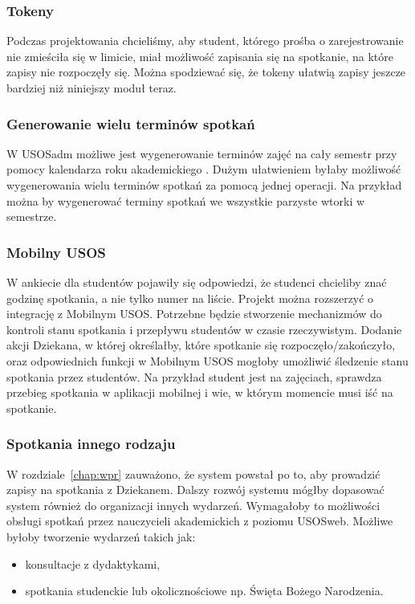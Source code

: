 \documentclass[licencjacka]{pracamgr}
\begin{document}
\subsubsection{Tokeny}
Podczas projektowania chcieliśmy, aby student, którego prośba o zarejestrowanie nie zmieściła się w limicie, miał możliwość zapisania się na spotkanie, na które zapisy nie rozpoczęły się. Można spodziewać się, że tokeny ułatwią zapisy jeszcze bardziej niż niniejszy moduł teraz.

\subsubsection{Generowanie wielu terminów spotkań}
W USOSadm możliwe jest wygenerowanie terminów zajęć na cały semestr przy pomocy kalendarza roku akademickiego \cite{kra}. Dużym ułatwieniem byłaby możliwość wygenerowania wielu terminów spotkań za pomocą jednej operacji. Na przykład można by wygenerować terminy spotkań we wszystkie parzyste wtorki w semestrze.

\subsubsection{Mobilny USOS}

W ankiecie dla studentów pojawiły się odpowiedzi, że studenci chcieliby znać godzinę spotkania, a nie tylko numer na liście. Projekt można rozszerzyć o integrację z Mobilnym USOS. Potrzebne będzie stworzenie mechanizmów do kontroli stanu spotkania i przepływu studentów w czasie rzeczywistym. Dodanie akcji Dziekana, w której określałby, które spotkanie się rozpoczęło/zakończyło, oraz odpowiednich funkcji w Mobilnym USOS mogłoby umożliwić śledzenie stanu spotkania przez studentów. Na przykład student jest na zajęciach, sprawdza przebieg spotkania w aplikacji mobilnej i wie, w którym momencie musi iść na spotkanie.

\subsubsection{Spotkania innego rodzaju}
W rozdziale~\ref{chap:wpr} zauważono, że system powstał po to, aby prowadzić zapisy na spotkania z Dziekanem. Dalszy rozwój systemu mógłby dopasować system również do organizacji innych wydarzeń. Wymagałoby to możliwości obsługi spotkań przez nauczycieli akademickich z poziomu USOSweb. Możliwe byłoby tworzenie wydarzeń takich jak:
\begin{itemize}
	\item konsultacje z dydaktykami,
	\item spotkania studenckie lub okolicznościowe np. Święta Bożego Narodzenia.
\end{itemize}
\end{document}
